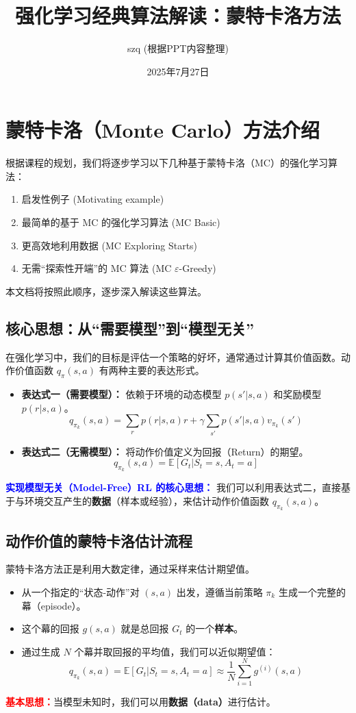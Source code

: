 \documentclass[12pt, a4paper]{article}
\title{\textbf{强化学习经典算法解读：蒙特卡洛方法}}
\author{szq (根据PPT内容整理)}
\date{2025年7月27日}
\newcommand{\E}{\mathbb{E}} %
\begin{document}
\maketitle
\tableofcontents
\newpage

\section{蒙特卡洛（Monte Carlo）方法介绍}
根据课程的规划，我们将逐步学习以下几种基于蒙特卡洛（MC）的强化学习算法：
\begin{enumerate}
    \item 启发性例子 (Motivating example)
    \item 最简单的基于 MC 的强化学习算法 (MC Basic)
    \item 更高效地利用数据 (MC Exploring Starts)
    \item 无需“探索性开端”的 MC 算法 (MC $\varepsilon$-Greedy)
\end{enumerate}
本文档将按照此顺序，逐步深入解读这些算法。

\subsection{核心思想：从“需要模型”到“模型无关”}
在强化学习中，我们的目标是评估一个策略的好坏，通常通过计算其价值函数。动作价值函数 $q_\pi(s, a)$ 有两种主要的表达形式。
\begin{itemize}
    \item \textbf{表达式一（需要模型）：} 依赖于环境的动态模型 $p(s'|s,a)$ 和奖励模型 $p(r|s,a)$。
    \[
        q_{\pi_k}(s, a) = \sum_{r} p(r|s, a)r + \gamma \sum_{s'} p(s'|s, a)v_{\pi_k}(s')
    \]
    
    \item \textbf{表达式二（无需模型）：} 将动作价值定义为回报（Return）的期望。
    \[
        q_{\pi_k}(s, a) = \E[G_t | S_t = s, A_t = a]
    \]
\end{itemize}
\textcolor{blue}{\textbf{实现模型无关（Model-Free）RL 的核心思想：}} 我们可以利用表达式二，直接基于与环境交互产生的\textbf{数据}（样本或经验），来估计动作价值函数 $q_{\pi_k}(s, a)$。

\subsection{动作价值的蒙特卡洛估计流程}
蒙特卡洛方法正是利用大数定律，通过采样来估计期望值。
\begin{itemize}
    \item 从一个指定的“状态-动作”对 $(s, a)$ 出发，遵循当前策略 $\pi_k$ 生成一个完整的幕（episode）。
    \item 这个幕的回报 $g(s,a)$ 就是总回报 $G_t$ 的一个\textbf{样本}。
    \item 通过生成 $N$ 个幕并取回报的平均值，我们可以近似期望值：
    \[
        q_{\pi_k}(s, a) = \E[G_t|S_t=s, A_t=a] \approx \frac{1}{N} \sum_{i=1}^{N} g^{(i)}(s, a)
    \]
\end{itemize}
\textcolor{red}{\textbf{基本思想：}}当模型未知时，我们可以用\textbf{数据（data）}进行估计。
\end{document}
